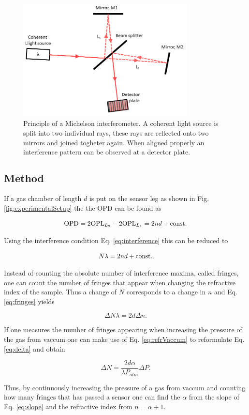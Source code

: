 \begin{figure}[H]
  \centering
  \includegraphics[width=0.8\textwidth]{Method.png}
  \caption{Principle of a Michelson interferometer. A coherent light source is split into two individual rays, these rays are reflected onto two mirrors and joined togheter again. When aligned properly an interference pattern can be observed at a detector plate.}
  \label{fig:michelsonInterferometer}
\end{figure}

\subsection{Method}

If a gas chamber of length $d$ is put on the sensor leg as shown in Fig. \ref{fig:experimentalSetup} the the OPD can be found as

\begin{equation}
  \label{eq:OPD}
  \textnormal{OPD} = 2\textnormal{OPL}_{L_2} - 2\textnormal{OPL}_{L_1} = 2nd + \textnormal{const.}
\end{equation}

Using the interference condition Eq. \eqref{eq:interference} this can be reduced to

\begin{equation}
\label{eq:fringes}
  N \lambda = 2nd + \textnormal{const.}
\end{equation}

Instead of counting the absolute number of interference maxima, called fringes, one can count the number of fringes that appear when changing the refractive index of the sample. Thus a change of $N$ corresponds to a change in $n$ and Eq. \ref{eq:fringes} yields

\begin{equation}
\label{eq:delta}
  \Delta N \lambda = 2d \Delta n.
\end{equation}

If one measures the number of fringes appearing when increasing the pressure of the gas from vaccum one can make use of Eq. \eqref{eq:refrVaccum} to reformulate Eq. \ref{eq:delta} and obtain

\begin{equation}
\label{eq:slope}
  \Delta N = \frac{2d\alpha}{\lambda P_{atm}} \Delta P.
\end{equation}

Thus, by continuously increasing the pressure of a gas from vaccum and counting how many fringes that has passed a sensor one can find the $\alpha$ from the slope of Eq. \eqref{eq:slope} and the refractive index from $n=\alpha+1$.

